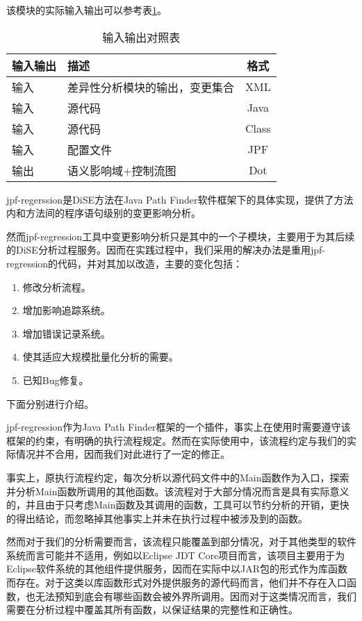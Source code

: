 该模块的实际输入输出可以参考表\ref {impact_io2}。

\begin{table}[H]
	\caption{输入输出对照表}
	\label{impact_io2}
	\centering
	\begin{tabular}{llc}
		\toprule[1.5pt]
		{\heiti 输入输出} & {\heiti 描述} & {\heiti 格式} \\\midrule[1pt]
		输入 & 差异性分析模块的输出，变更集合 & XML \\
		输入 & 源代码 & Java \\
		输入 & 源代码 & Class \\
		输入 & 配置文件 & JPF \\
		输出 & 语义影响域+控制流图 & Dot \\
		\bottomrule[1.5pt]
	\end{tabular}
\end{table}

jpf-regerssion是DiSE方法在Java Path Finder软件框架下的具体实现，提供了方法内和方法间的程序语句级别的变更影响分析。

然而jpf-regression工具中变更影响分析只是其中的一个子模块，主要用于为其后续的DiSE分析过程服务。因而在实践过程中，我们采用的解决办法是重用jpf-regression的代码，并对其加以改造，主要的变化包括：
\begin{enumerate}
	\item 修改分析流程。
	\item 增加影响追踪系统。
	\item 增加错误记录系统。
	\item 使其适应大规模批量化分析的需要。
	\item 已知Bug修复。
\end{enumerate}

下面分别进行介绍。


jpf-regression作为Java Path Finder框架的一个插件，事实上在使用时需要遵守该框架的约束，有明确的执行流程规定。然而在实际使用中，该流程约定与我们的实际情况并不合用，因而我们对此进行了一定的修正。

事实上，原执行流程约定，每次分析以源代码文件中的Main函数作为入口，探索并分析Main函数所调用的其他函数。该流程对于大部分情况而言是具有实际意义的，并且由于只考虑Main函数及其调用的函数，工具可以节约分析的开销，更快的得出结论，而忽略掉其他事实上并未在执行过程中被涉及到的函数。

然而对于我们的分析需要而言，该流程只能覆盖到部分情况，对于其他类型的软件系统而言可能并不适用，例如以Eclipse JDT Core项目而言，该项目主要用于为Eclipse软件系统的其他组件提供服务，因而在实际中以JAR包的形式作为库函数而存在。对于这类以库函数形式对外提供服务的源代码而言，他们并不存在入口函数，也无法预知到底会有哪些函数会被外界所调用。因而对于这类情况而言，我们需要在分析过程中覆盖其所有函数，以保证结果的完整性和正确性。

